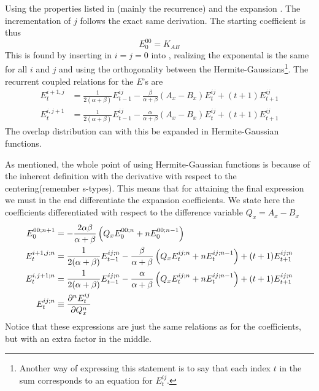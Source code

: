     Using the properties listed in  (mainly the
    recurrence) and the expansion . The incrementation of $j$
    follows the exact same derivation. The starting coefficient is thus
        \begin{equation}
            E^{00}_0 = K_{AB}
        \end{equation}
    This is found by inserting in $i=j=0$ into , realizing
    the exponental is the same for all $i$ and $j$ and using the orthogonality
    between the Hermite-Gaussians\footnote{Another way of expressing this
    statement is to say that each index $t$ in the sum corresponds to an
    equation for $E^{ij}_t$.}. The recurrent coupled relations for the
    $E$'s are
        \begin{equation}
            \begin{aligned}
                E^{i+1,j}_t &= \frac{1}{2(\alpha + \beta)}E^{ij}_{t-1} -
                \frac{\beta}{\alpha+\beta}(A_x - B_x)E^{ij}_t +
                (t+1)E^{ij}_{t+1} \\
                E^{i,j+1}_t &= \frac{1}{2(\alpha + \beta)}E^{ij}_{t-1} -
                \frac{\alpha}{\alpha+\beta}(A_x - B_x)E^{ij}_t +
                (t+1)E^{ij}_{t+1}
            \end{aligned}
        \end{equation}
    The overlap distribution can with this be expanded in Hermite-Gaussian
    functions.

    As mentioned, the whole point of using Hermite-Gaussian functions is
    because of the inherent definition with the derivative with respect to the
    centering(remember s-types). This means that for attaining the final
    expression we must in the end differentiate the expansion coefficients. We
    state here the coefficients differentiated with respect to the difference
    variable $Q_x=A_x-B_x$
        \begin{equation}
            \begin{aligned}
                E^{00;n+1}_0 &=
                -\frac{2\alpha\beta}{\alpha+\beta}\left(Q_xE^{00;n}_0 +
                nE^{00;n-1}_0\right) \\
                E^{i+1,j;n}_t &= \frac{1}{2(\alpha+\beta)}E^{ij;n}_{t-1} -
                \frac{\beta}{\alpha+\beta}\left(Q_xE^{ij;n}_t +
                nE^{ij;n-1}_t\right) + (t+1)E^{ij;n}_{t+1} \\
                E^{i,j+1;n}_t &= \frac{1}{2(\alpha+\beta)}E^{ij;n}_{t-1} -
                \frac{\alpha}{\alpha+\beta}\left(Q_xE^{ij;n}_t +
                nE^{ij;n-1}_t\right) + (t+1)E^{ij;n}_{t+1} \\
                E^{ij;n}_t &\equiv \frac{\mathrm{\partial}^n E^{ij}_t}{\mathrm{\partial} Q^n_x}
            \end{aligned}
        \end{equation}
    Notice that these expressions are just the same relations as for the
    coefficients, but with an extra factor in the middle.

